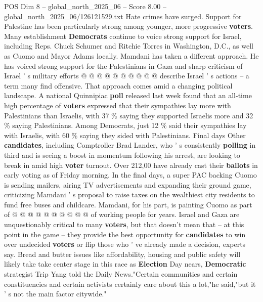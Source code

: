 \begin{textsample}{POS Dim 8 – global\_north\_2025\_06 – Score 8.00 – global\_north\_2025\_06/126121529.txt}
Hate crimes have surged.
Support for Palestine has been particularly strong among younger, more progressive \textbf{voters}.
Many establishment \textbf{Democrats} continue to voice strong support for Israel, including Reps.
Chuck Schumer and Ritchie Torres in Washington, D.C., as well as Cuomo and Mayor Adams locally.
Mamdani has taken a different approach.
He has voiced strong support for the Palestinians in Gaza and sharp criticism of Israel ' s military efforts @ @ @ @ @ @ @ @ @ @ describe Israel ' s actions -- a term many find offensive.
That approach comes amid a changing political landscape.
A national Quinnipiac \textbf{poll} released last week found that an all-time high percentage of \textbf{voters} expressed that their sympathies lay more with Palestinians than Israelis, with 37 \% saying they supported Israelis more and 32 \% saying Palestinians.
Among Democrats, just 12 \% said their sympathies lay with Israelis, with 60 \% saying they sided with Palestinians.
Final days Other \textbf{candidates}, including Comptroller Brad Lander, who ' s consistently \textbf{polling} in third and is seeing a boost in momentum following his arrest, are looking to break in amid high \textbf{voter} turnout.
Over 212,00 have already cast their \textbf{ballots} in early voting as of Friday morning.
In the final days, a super PAC backing Cuomo is sending mailers, airing TV advertisements and expanding their ground game, criticizing Mamdani ' s proposal to raise taxes on the wealthiest city residents to fund free buses and childcare.
Mamdani, for his part, is painting Cuomo as part of @ @ @ @ @ @ @ @ @ @ of working people for years.
Israel and Gaza are unquestionably critical to many \textbf{voters}, but that doesn't mean that -- at this point in the game -- they provide the best opportunity for \textbf{candidates} to win over undecided \textbf{voters} or flip those who ' ve already made a decision, experts say.
Bread and butter issues like affordability, housing and public safety will likely take take center stage in this race as \textbf{Election} Day nears, \textbf{Democratic} strategist Trip Yang told the Daily News."Certain communities and certain constituencies and certain activists certainly care about this a lot,"he said,"but it ' s not the main factor citywide."

\end{textsample}
